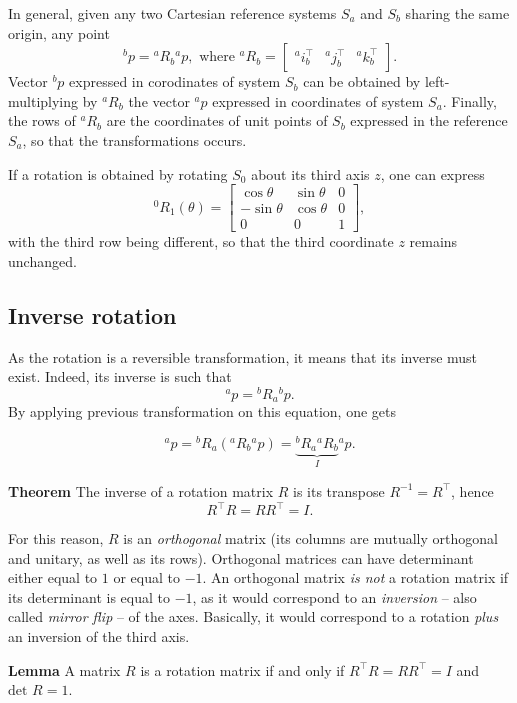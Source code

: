 \documentclass[10pt]{report}
\begin{document}
In general, given any two Cartesian reference systems \(S_a\) and \(S_b\) sharing the same origin, any point $${}^bp = {}^aR_b {}^a p, \mbox{ where } {}^aR_b = \begin{bmatrix} {}^a i^\top_b &  {}^a j^\top_b &  {}^a k^\top_b \end{bmatrix}.$$ Vector \({}^b p\) expressed in corodinates of system \(S_b\) can be obtained by left\--multiplying by \({}^aR_b\) the vector \({}^a p\) expressed in coordinates of system \(S_a\). Finally, the rows of \({}^a R_b\) are the coordinates of unit points of \(S_b\) expressed in the reference \(S_a\), so that the transformations occurs.

If a rotation is obtained by rotating \(S_0\) about its third axis \(z\), one can express \[{}^0 R_1(\theta) = \begin{bmatrix} \cos \theta & \sin \theta & 0 \\ -\sin \theta & \cos\theta & 0 \\ 0 & 0 & 1\end{bmatrix},\] with the third row being different, so that the third coordinate \(z\) remains unchanged.
\subsection{Inverse rotation}
\label{sec:org670ffc4}

As the rotation is a reversible transformation, it means that its inverse must exist. Indeed, its inverse is such that $${}^a p = {}^b R_a {}^b p.$$ By applying previous transformation on this equation, one gets

$${}^a p = {}^b R_a ({}^a R_b {}^a p) =\underbrace{{}^b R_a {}^a R_b}_{I} {}^a p.$$

\textbf{Theorem} The inverse of a rotation matrix \(R\) is its transpose \(R^{-1} = R^\top\), hence $$R^\top R = RR^\top = I.$$

For this reason, \(R\) is an \emph{orthogonal} matrix (its columns are mutually orthogonal and unitary, as well as its rows). Orthogonal matrices can have determinant either equal to \(1\) or equal to \(-1\). An orthogonal matrix \emph{is not} a rotation matrix if its determinant is equal to \(-1\), as it would correspond to an \emph{inversion} -- also called \emph{mirror flip} -- of the axes. Basically, it would correspond to a rotation \emph{plus} an inversion of the third axis.

\textbf{Lemma} A matrix \(R\) is a rotation matrix if and only if \(R^\top R= RR^\top = I\) and \(\mbox{det }R = 1\).
\end{document}
